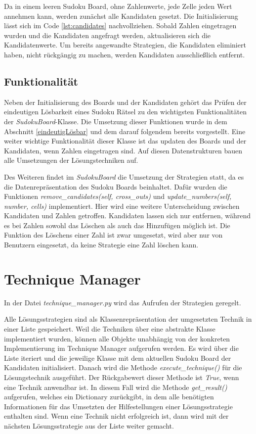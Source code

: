 Da in einem leeren Sudoku Board, ohne Zahlenwerte, jede Zelle jeden Wert annehmen kann, werden zunächst alle Kandidaten gesetzt. Die Initialisierung lässt sich im Code \ref{lst:candidates} nachvollziehen. Sobald Zahlen eingetragen wurden und die Kandidaten angefragt werden, aktualisieren sich die Kandidatenwerte. Um bereits angewandte Strategien, die Kandidaten eliminiert haben, nicht rückgängig zu machen, werden Kandidaten ausschließlich entfernt.

\subsection{Funktionalität}
Neben der Initialisierung des Boards und der Kandidaten gehört das Prüfen der eindeutigen Lösbarkeit eines Sudoku Rätsel zu den wichtigsten Funktionalitäten der \textit{SudokuBoard}-Klasse. Die Umsetzung dieser Funktionen wurde in dem Abschnitt \ref{eindeutigLösbar} und dem darauf folgendem bereits vorgestellt. Eine weiter wichtige Funktionalität dieser Klasse ist das updaten des Boards und der Kandidaten, wenn Zahlen eingetragen sind. Auf diesen Datenstrukturen bauen alle Umsetzungen der Lösungstechniken auf. 

Des Weiteren findet im \textit{SudokuBoard} die Umsetzung der Strategien statt, da es die Datenrepräsentation des Sudoku Boards beinhaltet. Dafür wurden die Funktionen \textit{remove\_candidates(self, cross\_outs)} und \textit{update\_numbers(self, number, cells)} implementiert. Hier wird eine weitere Unterscheidung zwischen Kandidaten und Zahlen getroffen. Kandidaten lassen sich nur entfernen, während es bei Zahlen sowohl das Löschen als auch das Hinzufügen möglich ist. Die Funktion des Löschens einer Zahl ist zwar umgesetzt, wird aber nur von Benutzern eingesetzt, da keine Strategie eine Zahl löschen kann.


\section{Technique Manager}

In der Datei \textit{technique\_manager.py} wird das Aufrufen der Strategien geregelt. 

Alle Lösungsstrategien sind als Klassenrepräsentation der umgesetzten Technik in einer Liste gespeichert. Weil die Techniken über eine abstrakte Klasse implementiert wurden, können alle Objekte unabhängig von der konkreten Implementierung im Technique Manager aufgerufen werden. Es wird über die Liste iteriert und die jeweilige Klasse mit dem aktuellen Sudoku Board der Kandidaten initialisiert. Danach wird die Methode \textit{execute\_technique()} für die Lösungstechnik ausgeführt. Der Rückgabewert dieser Methode ist \textit{True}, wenn eine Technik anwendbar ist. In diesem Fall wird die Methode \textit{get\_result()} aufgerufen, welches ein Dictionary zurückgibt, in dem alle benötigten Informationen für das Umsetzten der Hilfestellungen einer Lösungsstrategie enthalten sind.
Wenn eine Technik nicht erfolgreich ist, dann wird mit der nächsten Lösungsstrategie aus der Liste weiter gemacht. 

